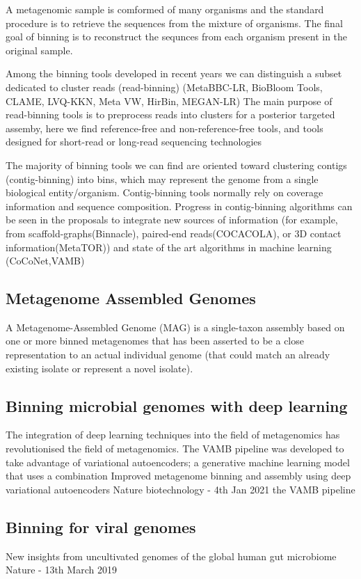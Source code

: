 \documentclass{article}
\begin{document}
A metagenomic sample is comformed of many organisms and the standard procedure is to retrieve the sequences from the mixture of organisms. The
final goal of binning is to reconstruct the sequnces from each organism present in the original sample.

Among the binning tools developed in recent years we can distinguish a subset dedicated to cluster reads (read-binning) (MetaBBC-LR, BioBloom Tools, CLAME, LVQ-KKN, Meta VW, HirBin, MEGAN-LR)
The main purpose of read-binning tools is to preprocess reads into clusters for a posterior targeted assemby, here we find reference-free and non-reference-free tools, and tools designed for short-read or long-read sequencing technologies

The majority of binning tools we can find are oriented toward clustering contigs (contig-binning) into bins, which may represent the genome from a single biological entity/organism.
Contig-binning tools normally rely on coverage information and sequence composition. Progress in contig-binning algorithms can be seen in the proposals to integrate new sources of information (for example, from scaffold-graphs(Binnacle), paired-end reads(COCACOLA), or 3D contact information(MetaTOR)) and state of the art algorithms in machine learning (CoCoNet,VAMB)


\subsection{Metagenome Assembled Genomes}
A Metagenome-Assembled Genome (MAG) is a single-taxon assembly based on one or more binned metagenomes that has been asserted to be a close representation to an actual individual genome (that could match an already existing isolate or represent a novel isolate).


\subsection{Binning microbial genomes with deep learning}
The integration of deep learning techniques into the field of metagenomics has revolutionised the field of metagenomics.
The VAMB pipeline was developed to take advantage of variational autoencoders; a generative machine learning model that uses a combination 
Improved metagenome binning and assembly using deep variational autoencoders
Nature biotechnology - 4th Jan 2021
the VAMB pipeline \cite{nissenimproved}

\subsection{Binning for viral genomes}
New insights from uncultivated genomes of the global human gut microbiome
Nature - 13th March 2019 \cite{nayfach2019new}
\end{document}
